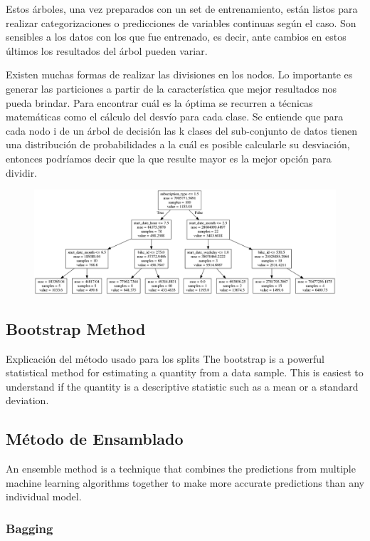 Estos árboles, una vez preparados con un set de entrenamiento, están listos para realizar categorizaciones o predicciones de variables continuas según el caso. Son sensibles a los datos con los que fue entrenado, es decir, ante cambios en estos últimos los resultados del árbol pueden variar.

Existen muchas formas de realizar las divisiones en los nodos. Lo importante es generar las particiones a partir de la característica que mejor resultados nos pueda brindar. Para encontrar cuál es la óptima se recurren a técnicas matemáticas como el cálculo del desvío para cada clase. Se entiende que para cada nodo i de un árbol de decisión las k clases del sub-conjunto de datos tienen una distribución de probabilidades a la cuál es posible calcularle su desviación, entonces podríamos decir que la que resulte mayor es la mejor opción para dividir. 

\begin{figure}[h!]
\centering
\includegraphics[width=165mm]{imagenes/tree.png}
\end{figure}


\subsection{Bootstrap Method}

Explicación del método usado para los splits
The bootstrap is a powerful statistical method for estimating a quantity from a data sample. This is easiest to understand if the quantity is a descriptive statistic such as a mean or a standard deviation.

\subsection{Método de Ensamblado}
An ensemble method is a technique that combines the predictions from multiple machine learning algorithms together to make more accurate predictions than any individual model.


\subsubsection{Bagging}

